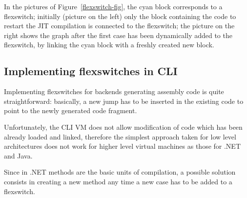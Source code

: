 In the pictures of Figure~\ref{flexswitch-fig}, the cyan block
corresponds to a flexswitch; initially (picture on the left) 
only the block containing the code to restart the JIT compilation
is connected to the flexswitch; the picture on the right
shows the graph after the first case has been dynamically added to the flexswitch,
by linking the cyan block with a freshly created new block.


\subsection{Implementing flexswitches in CLI}

Implementing flexswitches for backends generating assembly code is
quite straightforward: basically, a new jump has to be inserted in the
existing code to point to the newly generated code fragment.

Unfortunately, the CLI VM does not allow modification of code which
has been already loaded and linked, therefore the simplest approach
taken for low level architectures does not work for higher level 
virtual machines as those for .NET and Java.

Since in .NET methods are the basic units of compilation, a possible
solution consists in creating a new method 
any time a new case has to be added to a flexswitch.


